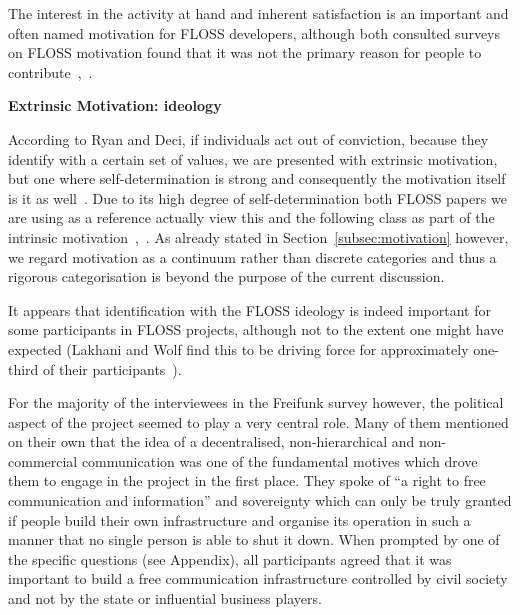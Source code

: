 The interest in the activity at hand and inherent satisfaction is an important and often named motivation for FLOSS developers, although both consulted surveys on FLOSS motivation found that it was not the primary reason for people to contribute~\cite{HarOu2002},~\cite{LakWo2005}.


\textbf{Extrinsic Motivation: ideology}

According to Ryan and Deci, if individuals act out of conviction, because they identify with a certain set of values, we are presented with extrinsic motivation, but one where self-determination is strong and consequently the motivation itself is it as well~\cite{RyDe2000}.
Due to its high degree of self-determination both FLOSS papers we are using as a reference actually view this and the following class as part of the intrinsic motivation~\cite{LakWo2005},~\cite{HarOu2002}.
As already stated in Section~\ref{subsec:motivation} however, we regard motivation as a continuum rather than discrete categories and thus a rigorous categorisation is beyond the purpose of the current discussion.

It appears that identification with the FLOSS ideology is indeed important for some participants in FLOSS projects, although not to the extent one might have expected (Lakhani and Wolf find this to be driving force for approximately one-third of their participants~\cite{LakWo2005}).

For the majority of the interviewees in the Freifunk survey however, the political aspect of the project seemed to play a very central role.
Many of them mentioned on their own that the idea of a decentralised, non-hierarchical and non-commercial communication was one of the fundamental motives which drove them to engage in the project in the first place.
They spoke of ``a right to free communication and information'' and sovereignty which can only be truly granted if people build their own infrastructure and organise its operation in such a manner that no single person is able to shut it down.
When prompted by one of the specific questions (see Appendix), all participants agreed that it was important to build a free communication infrastructure controlled by civil society and not by the state or influential business players.

